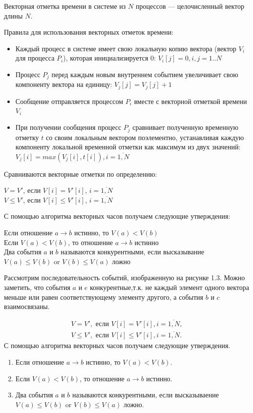 Векторная отметка времени в системе из $N$ процессов --- целочисленный вектор длины $N$.

Правила для использования векторных отметок времени:  
\begin{itemize}
\item Каждый процесс в системе имеет свою локальную копию вектора (вектор $V_i$ для процесса $P_i$), которая инициализируется $0$: $V_i[j] = 0, i,j = 1..N$ 
\item Процесс $P_j$ перед каждым новым внутреннем событием увеличивает свою компоненту вектора на единицу: $V_j[j] = V_j[j] + 1$
\item Сообщение отправляется процессом $P_i$ вместе с векторной отметкой времени $V_i$
\item При получении сообщения процесс $P_j$ сравнивает полученную временную отметку $t$ со своим локальным вектором поэлементно, устанавливая каждую компоненту локальной временной отметки как максимум из двух значений: $V_j[i] = max(V_j[i],t[i]), i = \overline{1,N}$
\end{itemize}
Сравниваются векторные отметки по определению: 

\begin{center}
$V = V'$, если $V[i] = V'[i]$, $i = \overline{1,N}$ \\
$V \leq V'$, если $V[i] \leq V'[i]$, $i = \overline{1,N}$ 
\end{center}
С помощью алгоритма векторных часов получаем следующие утверждения:
\begin{center}
Если отношение $a \rightarrow b$ истинно, то $V(a) < V(b)$\\
Если $V(a) < V(b)$, то отношение $a \rightarrow b$ истинно \\
Два события $a$ и $b$ называются конкурентными, если высказывание $V(a)\leq V(b)$ or $V(b)\leq V(a)$ ложно
\end{center}
Рассмотрим последовательность событий, изображенную на рисунке 1.3. Можно заметить, что события $a$ и $e$ конкурентные,т.к. не каждый элемент одного вектора меньше или равен соответствующему элементу другого, а события $b$ и $c$ взаимосвязаны. 

\begin{gather*}
  V = V', \text{ если } V[i] = V'[i], i = \overline{1,N}, \\
  V \leq V',  \text{ если } V[i] \leq V'[i], i = \overline{1,N} .
\end{gather*}
С помощью алгоритма векторных часов получаем следующие утверждения.
\begin{enumerate}
\item Если отношение $a \rightarrow b$ истинно, то $V(a) < V(b)$.
\item Если $V(a) < V(b)$, то отношение $a \rightarrow b$ истинно.
\item Два события $a$ и $b$ называются конкурентными, если высказываение $V(a)\leq V(b)$ or $V(b)\leq V(a)$ ложно.
\end{enumerate}

